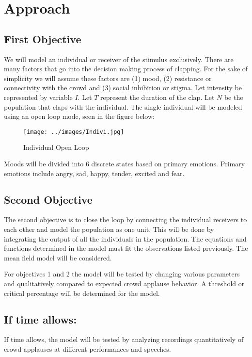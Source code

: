 \documentclass[12pt,letterpaper]{article}
\theoremstyle{definition}
\begin{document}
\section{Approach}
\subsection{First Objective}%
We will model an individual or receiver of the stimulus exclusively. There are many factors that go into the decision making process of clapping. For the sake of simplicity we will assume these factors are (1) mood, (2) resistance or connectivity with the crowd and (3) social inhibition or stigma.
Let intensity be represented by variable $I$. Let $T$ represent the duration of the clap. Let $N$ be the population that claps with the individual. 
The single individual will be modeled using an open loop mode, seen in the figure below:
\begin{figure}[h]
    \begin{center}
        \texttt{[image: ../images/Indivi.jpg]}
    \end{center}
    \caption{Individual Open Loop}
    \label{fig:Indivi}
\end{figure} 

Moods will be divided into 6 discrete states based on primary emotions. Primary emotions include angry, sad, happy, tender, excited and fear. 
\subsection{Second Objective}%

The second objective is to close the loop by connecting the individual receivers to each other and model the population as one unit. This will be done by integrating the output of all the individuals in the population. The equations and functions determined in the model must fit the observations listed previously. The mean field model will be considered.


For objectives 1 and 2 the model will be tested by changing various parameters and qualitatively compared to expected crowd applause behavior. A threshold or critical percentage will be determined for the model. 
\subsection{If time allows:}

If time allows, the model will be tested by analyzing recordings quantitatively of crowd applauses at different performances and speeches.
\end{document}
